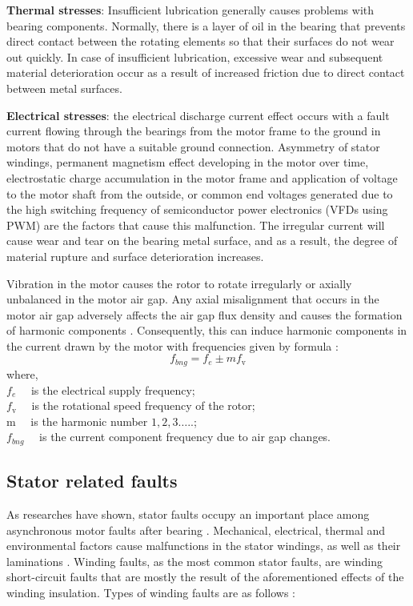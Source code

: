 \textbf{Thermal stresses}: Insufficient lubrication generally causes problems with bearing components. Normally, there is a layer of oil in the bearing that prevents direct contact between the rotating elements so that their surfaces do not wear out quickly. In case of insufficient lubrication, excessive wear and subsequent material deterioration occur as a result of increased friction due to direct contact between metal surfaces.

\textbf{Electrical stresses}: the electrical discharge current effect occurs with a fault current flowing through the bearings from the motor frame to the ground in motors that do not have a suitable ground connection. Asymmetry of stator windings, permanent magnetism effect developing in the motor over time, electrostatic charge accumulation in the motor frame and application of voltage to the motor shaft from the outside, or common end voltages generated due to the high switching frequency of semiconductor power electronics (VFDs using PWM) are the factors that cause this malfunction. The irregular current will cause wear and tear on the bearing metal surface, and as a result, the degree of material rupture and surface deterioration increases.

Vibration in the motor causes the rotor to rotate irregularly or axially unbalanced in the motor air gap. Any axial misalignment that occurs in the motor air gap adversely affects the air gap flux density and causes the formation of harmonic components \cite{schoen1995motor,en201320958,faiz2017fault}. Consequently, this can induce harmonic components in the current drawn by the motor with frequencies given by formula \cite{schoen1995motor}:
\begin{equation}
	f_{bng}=f_{e} \pm m f_{\mathrm{v}}
	\label{bearingfault}
\end{equation}
where,\\
$f_{e} \quad$ is the electrical supply frequency;\\
$f_{\mathrm{v}} \quad$ is the rotational speed frequency of the rotor;\\
$\mathrm{m} \quad$ is the harmonic number $1,2,3 \ldots$..;\\
$f_{bng} \quad$ is the current component frequency due to air gap changes.

\subsection{Stator related faults}

As researches have shown, stator faults occupy an important place among asynchronous motor faults after bearing \cite{motor1985report,albrecht1986assessment,albrecht1987assessment,thorsen1995survey,bonnett2008increased}. Mechanical, electrical, thermal and environmental factors cause malfunctions in the stator windings, as well as their laminations \cite{karmakar2016induction,Siddique}. Winding faults, as the most common stator faults, are winding short-circuit faults that are mostly the result of the aforementioned effects of the winding insulation. Types of winding faults are as follows \cite{karmakar2016induction,Siddique,lipo}:

